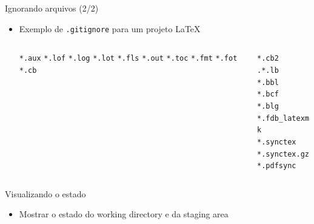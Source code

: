 \documentclass[aspectratio=169,14pt]{beamer}
\begin{document}
\begin{frame}[fragile]{Ignorando arquivos (2/2)}
    \begin{itemize}
        \item Exemplo de \texttt{.gitignore} para um projeto \LaTeX\\
        \begin{columns}
            \begin{column}{0.2\textwidth}
                \texttt{*.aux}
                \texttt{*.lof}
                \texttt{*.log}
                \texttt{*.lot}
                \texttt{*.fls}
                \texttt{*.out}
                \texttt{*.toc}
                \texttt{*.fmt}
                \texttt{*.fot}
                \texttt{*.cb}
            \end{column}
            \begin{column}{0.5\textwidth}                
                \texttt{*.cb2}\\
                \texttt{.*.lb}\\
                \texttt{*.bbl}\\
                \texttt{*.bcf}\\
                \texttt{*.blg}\\
                \texttt{*.fdb\_latexmk}\\
                \texttt{*.synctex}\\
                \texttt{*.synctex.gz}\\
                \texttt{*.pdfsync}
            \end{column}
        \end{columns}
    \end{itemize}    
\end{frame}

\begin{frame}[fragile]{Visualizando o estado}
    \begin{itemize}
        \item Mostrar o estado do working directory e da staging area
    \end{itemize}
\end{frame}
\end{document}
